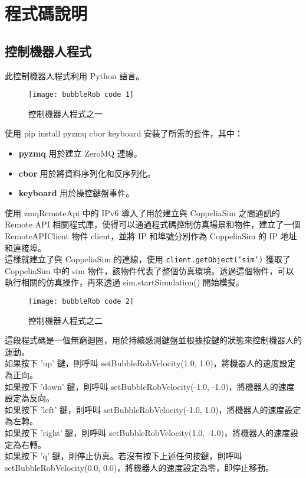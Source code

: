 \chapter{程式碼說明}
\renewcommand{\baselinestretch}{10.0} %
\setcounter{page}{6}  %
\fontsize{14pt}{2.5pt}\sectionef

\section{控制機器人程式}
此控制機器人程式利用 Python 語言。\\
\begin{figure}[hbt!]
\begin{center}
\texttt{[image: bubbleRob code 1]}
\caption{\Large 控制機器人程式之一}\label{控制機器人程式之一}
\end{center}
\end{figure} 
使用 pip install pyzmq cbor keyboard 安裝了所需的套件，其中：\\
\begin{itemize}
\item \textbf{pyzmq} 用於建立 ZeroMQ 連線。
\item \textbf{cbor} 用於將資料序列化和反序列化。
\item \textbf{keyboard} 用於操控鍵盤事件。
\end{itemize}
使用 zmqRemoteApi 中的 IPv6  導入了用於建立與 CoppeliaSim 之間通訊的 Remote API 相關程式庫，使得可以通過程式碼控制仿真場景和物件，建立了一個 RemoteAPIClient 物件 client，並將 IP 和埠號分別作為 CoppeliaSim 的 IP 地址和連接埠。\\
這樣就建立了與 CoppeliaSim 的連線，使用 \texttt{client.getObject('sim')} 獲取了 CoppeliaSim 中的 sim 物件，該物件代表了整個仿真環境。透過這個物件，可以執行相關的仿真操作，再來透過  sim.startSimulation() 開始模擬。\\
\newpage

\begin{figure}[hbt!]
\begin{center}
\texttt{[image: bubbleRob code 2]}
\caption{\Large 控制機器人程式之二}\label{控制機器人程式之二}
\end{center}
\end{figure} 
這段程式碼是一個無窮迴圈，用於持續感測鍵盤並根據按鍵的狀態來控制機器人的運動。\\
如果按下 'up' 鍵，則呼叫 setBubbleRobVelocity(1.0, 1.0)，將機器人的速度設定為正向。\\
如果按下 'down' 鍵，則呼叫 setBubbleRobVelocity(-1.0, -1.0)，將機器人的速度設定為反向。\\
如果按下 'left' 鍵，則呼叫 setBubbleRobVelocity(-1.0, 1.0)，將機器人的速度設定為左轉。\\
如果按下 'right' 鍵，則呼叫 setBubbleRobVelocity(1.0, -1.0)，將機器人的速度設定為右轉。\\
如果按下 'q' 鍵，則停止仿真。若沒有按下上述任何按鍵，則呼叫 setBubbleRobVelocity(0.0, 0.0)，將機器人的速度設定為零，即停止移動。\\
\newpage


